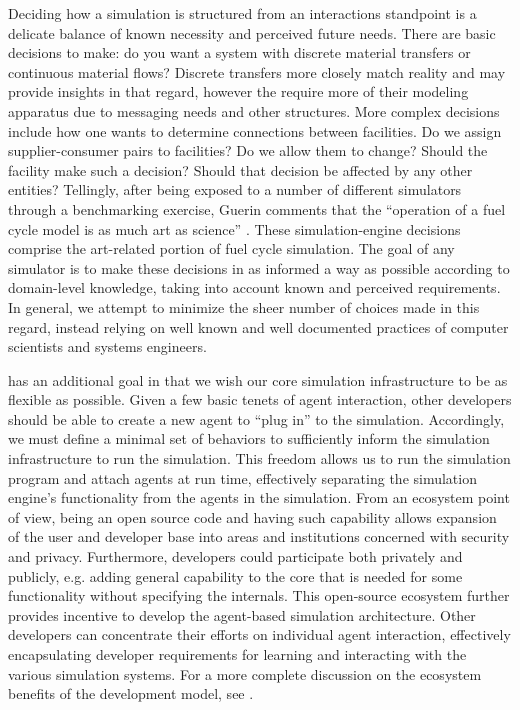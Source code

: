 Deciding how a simulation is structured from an interactions standpoint is a
delicate balance of known necessity and perceived future needs. There are basic
decisions to make: do you want a system with discrete material transfers or
continuous material flows? Discrete transfers more closely match reality and may
provide insights in that regard, however the require more of their modeling
apparatus due to messaging needs and other structures. More complex decisions
include how one wants to determine connections between facilities. Do we assign
supplier-consumer pairs to facilities? Do we allow them to change? Should the
facility make such a decision? Should that decision be affected by any other
entities? Tellingly, after being exposed to a number of different simulators
through a benchmarking exercise, Guerin comments that the ``operation of a fuel
cycle model is as much art as science'' \cite{guerin_benchmark_2009}. These
simulation-engine decisions comprise the art-related portion of fuel cycle
simulation. The goal of any simulator is to make these decisions in as informed
a way as possible according to domain-level knowledge, taking into account known
and perceived requirements. In general, we attempt to minimize the sheer number
of choices made in this regard, instead relying on well known and well
documented practices of computer scientists and systems engineers.

\Cyclus has an additional goal in that we wish our core simulation
infrastructure to be as flexible as possible. Given a few basic tenets of agent
interaction, other developers should be able to create a new agent to ``plug
in'' to the simulation. Accordingly, we must define a minimal set of behaviors
to sufficiently inform the simulation infrastructure to run the simulation. This
freedom allows us to run the simulation program and attach agents at run time,
effectively separating the simulation engine's functionality from the agents in
the simulation. From an ecosystem point of view, being an open source code and
having such capability allows expansion of the user and developer base into
areas and institutions concerned with security and privacy. Furthermore,
developers could participate both privately and publicly, e.g. adding general
capability to the \Cyclus core that is needed for some functionality without
specifying the internals. This open-source ecosystem further provides incentive
to develop the agent-based simulation architecture. Other developers can
concentrate their efforts on individual agent interaction, effectively
encapsulating developer requirements for learning and interacting with the
various simulation systems. For a more complete discussion on the ecosystem
benefits of the \Cyclus development model, see \cite{huff_open_2011}.

